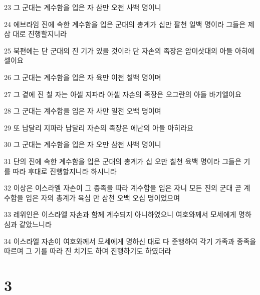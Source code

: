 \par 23 그 군대는 계수함을 입은 자 삼만 오천 사백 명이니
\par 24 에브라임 진에 속한 계수함을 입은 군대의 총계가 십만 팔천 일백 명이라 그들은 제 삼 대로 진행할지니라
\par 25 북편에는 단 군대의 진 기가 있을 것이라 단 자손의 족장은 암미삿대의 아들 아히에셀이요
\par 26 그 군대는 계수함을 입은 자 육만 이천 칠백 명이며
\par 27 그 곁에 진 칠 자는 아셀 지파라 아셀 자손의 족장은 오그란의 아들 바기엘이요
\par 28 그 군대는 계수함을 입은 자 사만 일천 오백 명이며
\par 29 또 납달리 지파라 납달리 자손의 족장은 에난의 아들 아히라요
\par 30 그 군대는 계수함을 입은 자 오만 삼천 사백 명이니
\par 31 단의 진에 속한 계수함을 입은 군대의 총계가 십 오만 칠천 육백 명이라 그들은 기를 따라 후대로 진행할지니라 하시니라
\par 32 이상은 이스라엘 자손이 그 종족을 따라 계수함을 입은 자니 모든 진의 군대 곧 계수함을 입은 자의 총계가 육십 만 삼천 오백 오십 명이었으며
\par 33 레위인은 이스라엘 자손과 함께 계수되지 아니하였으니 여호와께서 모세에게 명하심과 같았느니라
\par 34 이스라엘 자손이 여호와께서 모세에게 명하신 대로 다 준행하여 각기 가족과 종족을 따르며 그 기를 따라 진 치기도 하며 진행하기도 하였더라

\chapter{3}

